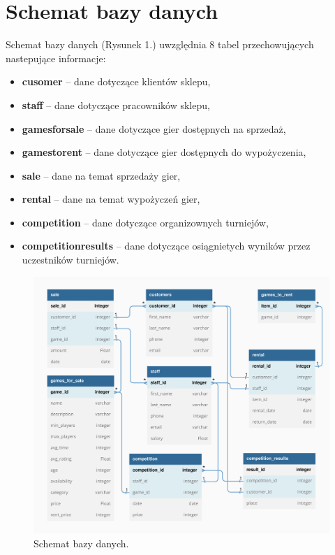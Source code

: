 \documentclass{article}
\begin{document}
	\section{Schemat bazy danych}
	Schemat bazy danych (Rysunek 1.) uwzględnia 8 tabel przechowujących nastepujące informacje:
	\begin{itemize}
		\setlength{\itemsep}{-2pt}
		\item \textbf{cusomer} – dane dotyczące klientów sklepu,
		\item \textbf{staff} – dane dotyczące pracowników sklepu,
		\item \textbf{games\textunderscore for\textunderscore sale} – dane dotyczące gier dostępnych na sprzedaż,
		\item \textbf{games\textunderscore to\textunderscore rent} – dane dotyczące gier dostępnych do wypożyczenia,
		\item \textbf{sale} – dane na temat sprzedaży gier,
		\item \textbf{rental} – dane na temat wypożyczeń gier,
		\item \textbf{competition} – dane dotyczące organizownych turniejów,
		\item \textbf{competition\textunderscore results} – dane dotyczące osiągnietych wyników przez uczestników turniejów.
	\end{itemize}
	
	\begin{figure}[!h]
		\centering
		\includegraphics[width=13cm]{database_schema.pdf}
		\vspace{-0.6cm}
		\caption{Schemat bazy danych.}
	\end{figure}
\end{document}
